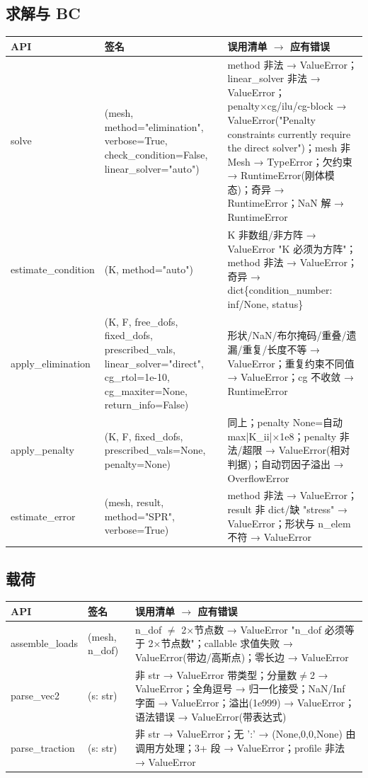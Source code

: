 \documentclass[12pt,a4paper]{ctexart}
\begin{document}
\subsection{求解与 BC}

\begin{longtable}{p{4.2cm}p{4.0cm}p{6.0cm}}
\toprule
\textbf{API} & \textbf{签名} & \textbf{误用清单 $\to$ 应有错误} \\
\midrule
solve & (mesh, method="elimination", verbose=True, check\_\allowbreak condition=False, linear\_solver="auto") & method 非法 → ValueError；linear\_solver 非法 → ValueError；penalty×cg/ilu/cg-block → ValueError("Penalty constraints currently require the direct solver")；mesh 非 Mesh → TypeError；欠约束 → RuntimeError(刚体模态)；奇异 → RuntimeError；NaN 解 → RuntimeError \\
estimate\_condition & (K, method="auto") & K 非数组/非方阵 → ValueError "K 必须为方阵"；method 非法 → ValueError；奇异 → dict\{condition\_number: inf/None, status\} \\
apply\_elimination & (K, F, free\_dofs, fixed\_dofs, prescribed\_vals, linear\_solver="direct", cg\_rtol=1e-10, cg\_maxiter=None, return\_info=False) & 形状/NaN/布尔掩码/重叠/遗漏/重复/长度不等 → ValueError；重复约束不同值 → ValueError；cg 不收敛 → RuntimeError \\
apply\_penalty & (K, F, fixed\_dofs, prescribed\_vals=None, penalty=None) & 同上；penalty None=自动 max|K\_ii|×1e8；penalty 非法/超限 → ValueError(相对判据)；自动罚因子溢出 → OverflowError \\
estimate\_error & (mesh, result, method="SPR", verbose=True) & method 非法 → ValueError；result 非 dict/缺 "stress" → ValueError；形状与 n\_elem 不符 → ValueError \\
\bottomrule
\end{longtable}

\subsection{载荷}

\begin{longtable}{p{4.2cm}p{4.0cm}p{6.0cm}}
\toprule
\textbf{API} & \textbf{签名} & \textbf{误用清单 $\to$ 应有错误} \\
\midrule
assemble\_loads & (mesh, n\_dof) & n\_dof $\neq$ 2×节点数 → ValueError "n\_dof 必须等于 2×节点数"；callable 求值失败 → ValueError(带边/高斯点)；零长边 → ValueError \\
parse\_vec2 & (s: str) & 非 str → ValueError 带类型；分量数$\neq$2 → ValueError；全角逗号 → 归一化接受；NaN/Inf 字面 → ValueError；溢出(1e999) → ValueError；语法错误 → ValueError(带表达式) \\
parse\_traction & (s: str) & 非 str → ValueError；无 ':' → (None,0,0,None) 由调用方处理；3+ 段 → ValueError；profile 非法 → ValueError \\
\bottomrule
\end{longtable}
\end{document}
